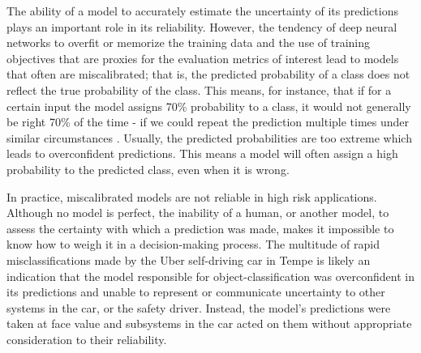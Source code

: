The ability of a model to accurately estimate the uncertainty of its predictions plays an important role in its reliability. However, the tendency of deep neural networks to overfit or memorize the training data \cite{arpit_closer_2017, burg_memorization_2021} and the use of training objectives that are proxies for the evaluation metrics of interest lead to models that often are miscalibrated; that is, the predicted probability of a class does not reflect the true probability of the class. This means, for instance, that if for a certain input the model assigns 70\% probability to a class, it would not generally be right 70\% of the time - if we could repeat the prediction multiple times under similar circumstances \cite{guo_calibration_2017, kull_temperature_2019}. Usually, the predicted probabilities are too extreme which leads to overconfident predictions. This means a model will often assign a high probability to the predicted class, even when it is wrong. 

In practice, miscalibrated models are not reliable in high risk applications. Although no model is perfect, the inability of a human, or another model, to assess the certainty with which a prediction was made, makes it impossible to know how to weigh it in a decision-making process. 
The multitude of rapid misclassifications made by the Uber self-driving car in Tempe is likely an indication that the model responsible for object-classification was overconfident in its predictions and unable to represent or communicate uncertainty to other systems in the car, or the safety driver. Instead, the model's predictions were taken at face value and subsystems in the car acted on them without appropriate consideration to their reliability.


